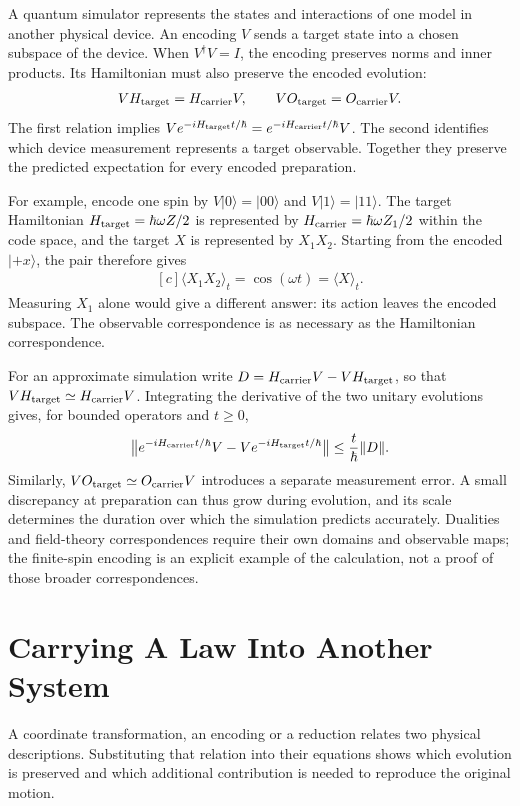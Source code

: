 \documentclass[11pt,oneside]{book}
\newenvironment{centeredalign}{\[\begin{gathered}[c]}{\end{gathered}\]}
\begin{document}
A quantum simulator represents the states and interactions of one model
in another physical device. An encoding \(V\) sends a target state into
a chosen subspace of the device. When \(V^\dagger V=I\), the encoding
preserves norms and inner products. Its Hamiltonian must also preserve
the encoded evolution:
\begin{centeredalign}
VH_{\rm target}=H_{\rm carrier}V,\qquad
VO_{\rm target}=O_{\rm carrier}V.
\end{centeredalign}
The first relation implies
\(Ve^{-iH_{\rm target}t/\hbar}=e^{-iH_{\rm carrier}t/\hbar}V\).
The second identifies which device measurement represents a target
observable. Together they preserve the predicted expectation for every
encoded preparation.

For example, encode one spin by
\(V|0\rangle=|00\rangle\) and \(V|1\rangle=|11\rangle\).
The target Hamiltonian \(H_{\rm target}=\hbar\omega Z/2\) is
represented by \(H_{\rm carrier}=\hbar\omega Z_1/2\) within the
code space, and the target \(X\) is represented by \(X_1X_2\).
Starting from the encoded \(|+x\rangle\), the pair therefore gives
\begin{centeredalign}
\langle X_1X_2\rangle_t=\cos(\omega t)=\langle X\rangle_t.
\end{centeredalign}
Measuring \(X_1\) alone would give a different answer: its action
leaves the encoded subspace. The observable correspondence is as
necessary as the Hamiltonian correspondence.

For an approximate simulation write
\(D=H_{\rm carrier}V-VH_{\rm target}\), so that
\(VH_{\rm target}\simeq H_{\rm carrier}V\). Integrating the derivative
of the two unitary evolutions gives, for bounded operators and \(t\geq0\),
\begin{centeredalign}
\big\|e^{-iH_{\rm carrier}t/\hbar}V
-Ve^{-iH_{\rm target}t/\hbar}\big\|
\leq\frac{t}{\hbar}\|D\|.
\end{centeredalign}
Similarly, \(VO_{\rm target}\simeq O_{\rm carrier}V\) introduces
a separate measurement error. A small discrepancy at preparation can
thus grow during evolution, and its scale determines the duration over
which the simulation predicts accurately. Dualities and field-theory
correspondences require their own domains and observable maps; the
finite-spin encoding is an explicit example of the calculation, not
a proof of those broader correspondences.



\chapter{Carrying A Law Into Another System}\label{chap:transfer}
\begin{claimbox}
A coordinate transformation, an encoding or a reduction relates two
physical descriptions. Substituting that relation into their equations
shows which evolution is preserved and which additional contribution
is needed to reproduce the original motion.
\end{claimbox}
\end{document}
